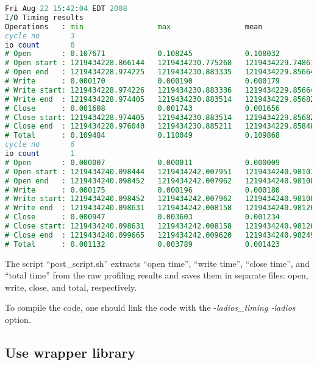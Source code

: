 {\small 
\begin{lstlisting}[language=Fortran, frame=single, backgroundcolor=\color{gray85}]
Fri Aug 22 15:42:04 EDT 2008
I/O Timing results
Operations   : min                 max                 mean                var
cycle no       3
io count       0
# Open       : 0.107671            0.108245            0.108032            0.000124
# Open start : 1219434228.866144   1219434230.775268   1219434229.748614   0.588501
# Open end   : 1219434228.974225   1219434230.883335   1219434229.856646   0.588486
# Write      : 0.000170            0.000190            0.000179            0.000005
# Write start: 1219434228.974226   1219434230.883336   1219434229.856647   0.588486
# Write end  : 1219434228.974405   1219434230.883514   1219434229.856826   0.588484
# Close      : 0.001608            0.001743            0.001656            0.000036
# Close start: 1219434228.974405   1219434230.883514   1219434229.856826   0.588484
# Close end  : 1219434228.976040   1219434230.885211   1219434229.858482   0.588489
# Total      : 0.109484            0.110049            0.109868            0.000137
cycle no       6
io count       1
# Open       : 0.000007            0.000011            0.000009            0.000001
# Open start : 1219434240.098444   1219434242.007951   1219434240.981075   0.588556
# Open end   : 1219434240.098452   1219434242.007962   1219434240.981083   0.588556
# Write      : 0.000175            0.000196            0.000180            0.000004
# Write start: 1219434240.098452   1219434242.007962   1219434240.981083   0.588557
# Write end  : 1219434240.098631   1219434242.008158   1219434240.981264   0.588558
# Close      : 0.000947            0.003603            0.001234            0.000466
# Close start: 1219434240.098631   1219434242.008158   1219434240.981264   0.588558
# Close end  : 1219434240.099665   1219434242.009620   1219434240.982498   0.588447
# Total      : 0.001132            0.003789            0.001423            0.000466

\end{lstlisting}
}

The script ``post\_script.sh'' extracts ``open time'', ``write time'', ``close 
time'', and ``total time'' from the raw profiling results and saves them in separate 
files: open, write, close, and total, respectively.

To compile the code, one should link the code with the -\textit{ladios\_timing 
-ladios} option. 

\subsection{Use wrapper library}

